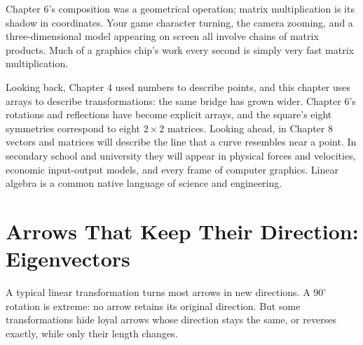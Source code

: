 Chapter 6's composition was a geometrical operation; matrix multiplication is its shadow in coordinates. Your game character turning, the camera zooming, and a three-dimensional model appearing on screen all involve chains of matrix products. Much of a graphics chip's work every second is simply very fast matrix multiplication.

\begin{lianjie}
Looking back, Chapter 4 used numbers to describe points, and this chapter uses arrays to describe transformations: the same bridge has grown wider. Chapter 6's rotations and reflections have become explicit arrays, and the square's eight symmetries correspond to eight $2\times2$ matrices. Looking ahead, in Chapter 8 vectors and matrices will describe the line that a curve resembles near a point. In secondary school and university they will appear in physical forces and velocities, economic input-output models, and every frame of computer graphics. Linear algebra is a common native language of science and engineering.
\end{lianjie}

\section{Arrows That Keep Their Direction: Eigenvectors}

A typical linear transformation turns most arrows in new directions. A $90^\circ$ rotation is extreme: no arrow retains its original direction. But some transformations hide loyal arrows whose direction stays the same, or reverses exactly, while only their length changes.

